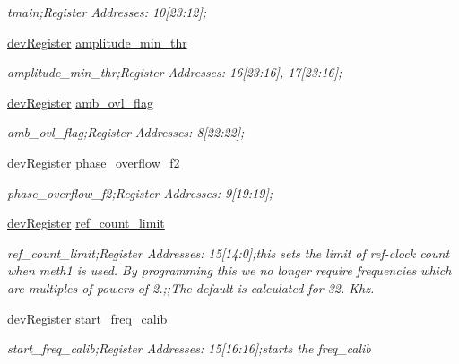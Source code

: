 \begin{DoxyCompactItemize}
\begin{DoxyCompactList}\small\item\em tmain;Register Addresses\+: 10\mbox{[}23\+:12\mbox{]}; \end{DoxyCompactList}\item 
\mbox{\hyperlink{classdev_register}{dev\+Register}} \mbox{\hyperlink{class_o_p_t3101_registers_a7b68f2c8301673bf2329bf3d1c2068d7}{amplitude\+\_\+min\+\_\+thr}}
\begin{DoxyCompactList}\small\item\em amplitude\+\_\+min\+\_\+thr;Register Addresses\+: 16\mbox{[}23\+:16\mbox{]}, 17\mbox{[}23\+:16\mbox{]}; \end{DoxyCompactList}\item 
\mbox{\hyperlink{classdev_register}{dev\+Register}} \mbox{\hyperlink{class_o_p_t3101_registers_a19befaa619d0fb2f67f549afcc1a2182}{amb\+\_\+ovl\+\_\+flag}}
\begin{DoxyCompactList}\small\item\em amb\+\_\+ovl\+\_\+flag;Register Addresses\+: 8\mbox{[}22\+:22\mbox{]}; \end{DoxyCompactList}\item 
\mbox{\hyperlink{classdev_register}{dev\+Register}} \mbox{\hyperlink{class_o_p_t3101_registers_a7897fc2401a047a6d200d99db4ac75d1}{phase\+\_\+overflow\+\_\+f2}}
\begin{DoxyCompactList}\small\item\em phase\+\_\+overflow\+\_\+f2;Register Addresses\+: 9\mbox{[}19\+:19\mbox{]}; \end{DoxyCompactList}\item 
\mbox{\hyperlink{classdev_register}{dev\+Register}} \mbox{\hyperlink{class_o_p_t3101_registers_aa5c53aaed040db50cd7897e52c82bfcb}{ref\+\_\+count\+\_\+limit}}
\begin{DoxyCompactList}\small\item\em ref\+\_\+count\+\_\+limit;Register Addresses\+: 15\mbox{[}14\+:0\mbox{]};this sets the limit of ref-\/clock count when meth1 is used. By programming this we no longer require frequencies which are multiples of powers of 2.;;The default is calculated for 32. Khz. \end{DoxyCompactList}\item 
\mbox{\hyperlink{classdev_register}{dev\+Register}} \mbox{\hyperlink{class_o_p_t3101_registers_a3c3a3e1e1963a607ab8a1cffec6bcec6}{start\+\_\+freq\+\_\+calib}}
\begin{DoxyCompactList}\small\item\em start\+\_\+freq\+\_\+calib;Register Addresses\+: 15\mbox{[}16\+:16\mbox{]};starts the freq\+\_\+calib \end{DoxyCompactList}\item 

\end{DoxyCompactItemize}
